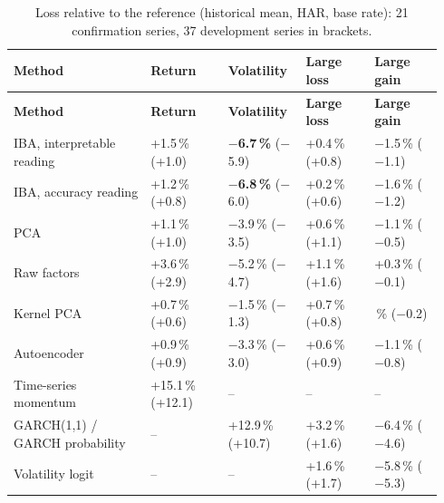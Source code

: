 {\scriptsize\setlength{\tabcolsep}{4pt}\renewcommand{\arraystretch}{1.2}
\begin{longtable}{@{}>{\raggedright\arraybackslash}p{0.303\linewidth}>{\raggedright\arraybackslash}p{0.171\linewidth}>{\raggedright\arraybackslash}p{0.171\linewidth}>{\raggedleft\arraybackslash}p{0.150\linewidth}>{\raggedleft\arraybackslash}p{0.150\linewidth}@{}}
\caption{Loss relative to the reference (historical mean, HAR, base rate): 21 confirmation series, 37 development series in brackets.}\label{tab:4}\\
\toprule
\textbf{Method} & \textbf{Return} & \textbf{Volatility} & \textbf{Large loss} & \textbf{Large gain} \\
\midrule
\endfirsthead
\toprule
\textbf{Method} & \textbf{Return} & \textbf{Volatility} & \textbf{Large loss} & \textbf{Large gain} \\
\midrule
\endhead
\bottomrule
\endlastfoot
IBA, interpretable reading & +1.5\,\% (+1.0) & \textbf{\ensuremath{-}6.7\,\%} (\ensuremath{-}5.9) & +0.4\,\% (+0.8) & \ensuremath{-}1.5\,\% (\ensuremath{-}1.1) \\
IBA, accuracy reading & +1.2\,\% (+0.8) & \textbf{\ensuremath{-}6.8\,\%} (\ensuremath{-}6.0) & +0.2\,\% (+0.6) & \ensuremath{-}1.6\,\% (\ensuremath{-}1.2) \\
PCA & +1.1\,\% (+1.0) & \ensuremath{-}3.9\,\% (\ensuremath{-}3.5) & +0.6\,\% (+1.1) & \ensuremath{-}1.1\,\% (\ensuremath{-}0.5) \\
Raw factors & +3.6\,\% (+2.9) & \ensuremath{-}5.2\,\% (\ensuremath{-}4.7) & +1.1\,\% (+1.6) & +0.3\,\% (\ensuremath{-}0.1) \\
Kernel PCA & +0.7\,\% (+0.6) & \ensuremath{-}1.5\,\% (\ensuremath{-}1.3) & +0.7\,\% (+0.8) & 0.0\,\% (\ensuremath{-}0.2) \\
Autoencoder & +0.9\,\% (+0.9) & \ensuremath{-}3.3\,\% (\ensuremath{-}3.0) & +0.6\,\% (+0.9) & \ensuremath{-}1.1\,\% (\ensuremath{-}0.8) \\
Time-series momentum & +15.1\,\% (+12.1) & -- & -- & -- \\
GARCH(1,1) / GARCH probability & -- & +12.9\,\% (+10.7) & +3.2\,\% (+1.6) & \ensuremath{-}6.4\,\% (\ensuremath{-}4.6) \\
Volatility logit & -- & -- & +1.6\,\% (+1.7) & \ensuremath{-}5.8\,\% (\ensuremath{-}5.3) \\
\end{longtable}}
